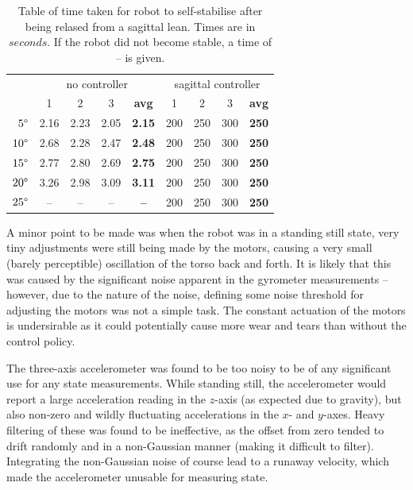 \begin{table}[h]
  \centering
    \begin{tabular}{ r|cccc|cccc| }
    \multicolumn{1}{r}{}
     &  \multicolumn{4}{c}{no controller}
     & \multicolumn{4}{c}{sagittal controller} \\
    \multicolumn{1}{r}{}
     &  \multicolumn{1}{c}{1}
     &  \multicolumn{1}{c}{2}
     &  \multicolumn{1}{c}{3}
     &  \multicolumn{1}{c}{\textbf{avg}}
     &  \multicolumn{1}{c}{1}
     &  \multicolumn{1}{c}{2}
     &  \multicolumn{1}{c}{3}
     &  \multicolumn{1}{c}{\textbf{avg}} \\
    \cline{2-9}
    $5\degree$ & 2.16 & 2.23 & 2.05 & \textbf{2.15} & 200 & 250 & 300 & \textbf{250} \\
    $10\degree$ & 2.68 & 2.28 & 2.47 & \textbf{2.48} & 200 & 250 & 300 & \textbf{250} \\
    $15\degree$ & 2.77 & 2.80 & 2.69 & \textbf{2.75} & 200 & 250 & 300 & \textbf{250} \\
    $20\degree$ & 3.26 & 2.98 & 3.09 & \textbf{3.11} & 200 & 250 & 300 & \textbf{250} \\
    $25\degree$ & -- & -- & -- & \textbf{--} & 200 & 250 & 300 & \textbf{250} \\
    \cline{2-9}
    \cline{2-9}
    \end{tabular}
  \caption{Table of time taken for robot to self-stabilise after being relased from a sagittal lean. Times are in $seconds$. If the robot did not become stable, a time of -- is given.}
  \label{tab:results}
\end{table}

A minor point to be made was when the robot was in a standing still state, very tiny adjustments were still being made by the motors, causing a very small (barely perceptible) oscillation of the torso back and forth. It is likely that this was caused by the significant noise apparent in the gyrometer measurements -- however, due to the nature of the noise, defining some noise threshold for adjusting the motors was not a simple task. The constant actuation of the motors is undersirable as it could potentially cause more wear and tears than without the control policy.

The three-axis accelerometer was found to be too noisy to be of any significant use for any state measurements. While standing still, the accelerometer would report a large acceleration reading in the $z$-axis (as expected due to gravity), but also non-zero and wildly fluctuating accelerations in the $x$- and $y$-axes. Heavy filtering of these was found to be ineffective, as the offset from zero tended to drift randomly and in a non-Gaussian manner (making it difficult to filter). Integrating the non-Gaussian noise of course lead to a runaway velocity, which made the accelerometer unusable for measuring state.

